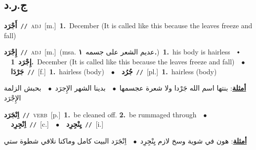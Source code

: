\documentclass[10pt,a4paper,twoside]{article} %
\begin{document}
\begin{multicols}{2}
\vspace{-3mm}
\subsection*{\color{blue}\foreignlanguage{arabic}{ج.ر.د}\color{blue}{}} 

{\setlength\topsep{0pt}\textbf{\foreignlanguage{arabic}{أَجْرَد}}\ {\color{gray}\texttt{//}\color{black}}\ \textsc{adj}\ [m.]\ \textbf{1.}~December (It is called like this because the leaves freeze and fall)\ } \vspace{2mm}

{\setlength\topsep{0pt}\textbf{\foreignlanguage{arabic}{إِجْرَد}}\ {\color{gray}\texttt{//}\color{black}}\ \textsc{adj}\ [m.]\ \color{gray}(msa. \foreignlanguage{arabic}{عديم الشعر على جسمه}~\foreignlanguage{arabic}{\textbf{١.}})\color{black}\ \textbf{1.}~his body is hairless\ \ $\smblkdiamond$\ \ \setlength\topsep{0pt}\textbf{\foreignlanguage{arabic}{إِجْرَد}}\ \textbf{1.}~December (It is called like this because the leaves freeze and fall)\ \ $\bullet$\ \ \setlength\topsep{0pt}\textbf{\foreignlanguage{arabic}{جَرْدَا}}\ {\color{gray}\texttt{//}\color{black}}\ [f.]\ \textbf{1.}~hairless (body)\ \ $\bullet$\ \ \setlength\topsep{0pt}\textbf{\foreignlanguage{arabic}{جُرُد}}\ {\color{gray}\texttt{//}\color{black}}\ [pl.]\ \textbf{1.}~hairless (body)\  \begin{flushright}\color{gray}\foreignlanguage{arabic}{\textbf{\underline{\foreignlanguage{arabic}{أمثلة}}}: بنتها اسم الله جَرْدا ولا شعرة عجسمها\ $\bullet$\ \  بدينا الشهر الإِجرَد\ $\bullet$\ \  بحبش الزلمة الإِجْرَد}\end{flushright}\color{black}} \vspace{2mm}

{\setlength\topsep{0pt}\textbf{\foreignlanguage{arabic}{اِنْجَرَد}}\ {\color{gray}\texttt{//}\color{black}}\ \textsc{verb}\ [p.]\ \textbf{1.}~be cleaned off.  \textbf{2.}~be rummaged through\ \ $\bullet$\ \ \setlength\topsep{0pt}\textbf{\foreignlanguage{arabic}{اِنْجِرِد}}\ {\color{gray}\texttt{//}\color{black}}\ [c.]\ \ $\bullet$\ \ \setlength\topsep{0pt}\textbf{\foreignlanguage{arabic}{يِنْجِرِد}}\ {\color{gray}\texttt{//}\color{black}}\ [i.]\  \begin{flushright}\color{gray}\foreignlanguage{arabic}{\textbf{\underline{\foreignlanguage{arabic}{أمثلة}}}: هون في شوية وسخ لازم يِنْجِرِد\ $\bullet$\ \  اِنْجَرَد البيت كامل وماكنا نلاقي شطوة ستي}\end{flushright}\color{black}} \vspace{2mm}


\end{multicols}
\end{document}
